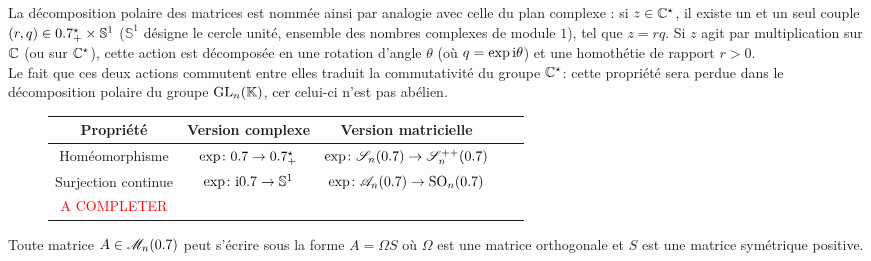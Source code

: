 La décomposition polaire des matrices est nommée ainsi par analogie avec celle du plan complexe : si $z \in \Ce$, il existe un et un seul couple $(r, q) \in \Rpe \times \mathbb{S}^1$ ($\mathbb{S}^1$ désigne le cercle unité, ensemble des nombres complexes de module $1$), tel que $z = rq$. Si $z$ agit par multiplication sur $\C$ (ou sur $\Ce$), cette action est décomposée en une rotation d'angle $\theta$ (où $q = \exp \i \theta$) et une homothétie de rapport $r > 0$. \\
Le fait que ces deux actions commutent entre elles traduit la commutativité du groupe $\Ce$: cette propriété sera perdue dans le décomposition polaire du groupe $\Gl_n(\K)$, cer celui-ci n'est pas abélien. \

\begin{figure}[h!]
    \begingroup
    \renewcommand{\arraystretch}{1.5} %
    \begin{tabular}{|c|c|c|c|c|}
        \hline
        Propriété & Version complexe & Version matricielle \\
        \hline \hline
        Homéomorphisme & $\fonctionens[\exp]{\R}{\Rpe}$ & $\fonctionens[\exp]{\mathscr{S}_n(\R)}{\mathscr{S}_n^{++}(\R)}$\\
        \hline
        Surjection continue & $\fonctionens[\exp]{\i \R}{\mathbb{S}^1}$ & $\fonctionens[\exp]{\mathscr{A}_n(\R)}{\mathrm{SO}_n(\R)}$ \\
        \hline
        \textcolor{red}{A COMPLETER}  & & \\
        \hline
    \end{tabular}
    \endgroup
\end{figure}


\begin{corol}
    Toute matrice $A \in \M_n(\R)$ peut s'écrire sous la forme $A = \Omega S$ où $\Omega$ est une matrice orthogonale et $S$ est une matrice symétrique positive.
\end{corol}

